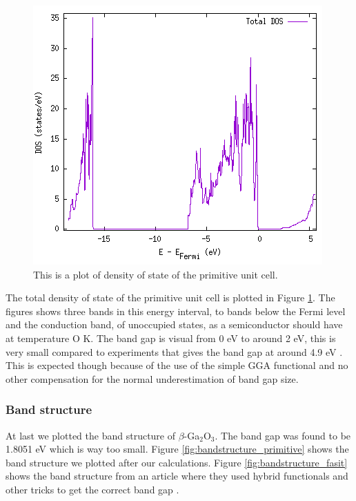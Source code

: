 \begin{figure}[H]
\includegraphics[width=\linewidth]{../fig/dosplot/total_DOS_primitive}\caption{This is a plot of density of state of the primitive unit cell.}\label{fig:total_dos_primitive}
\end{figure}

The total density of state of the primitive unit cell is plotted in Figure \ref{fig:total_dos_primitive}. The figures shows three bands in this energy interval, to bands below the Fermi level and the conduction band, of unoccupied states, as a semiconductor should have at temperature O K. The band gap is visual from 0 eV to around 2 eV, this is very small compared to experiments that gives the band gap at around 4.9 eV \cite{dft_ga2o3}. This is expected though because of the use of the simple GGA functional and no other compensation for the normal underestimation of band gap size.


\subsubsection{Band structure}

At last we plotted the band structure of $\beta$-Ga$_2$O$_3$. The band gap was found to be 1.8051 eV which is way too small. Figure \ref{fig:bandstructure_primitive} shows the band structure we plotted after our calculations. Figure \ref{fig:bandstructure_fasit} shows the band structure from an article where they used hybrid functionals and other tricks to get the correct band gap \cite{dft_ga2o3}. 


